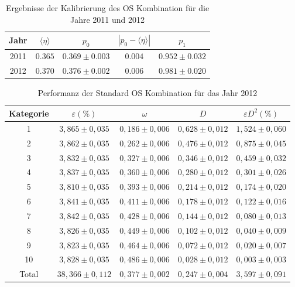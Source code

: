 \begin{table}[htbp]
	\centering
	\caption{Ergebnisse der Kalibrierung des OS Kombination für die Jahre \num{2011} und \num{2012}}
	\label{tab:result_OScomb}
	\begin{tabular}{ccccc}
	\toprule
       Jahr & $\langle\eta\rangle$ & $p_0$ & $\left|p_0-\langle\eta\rangle\right|$ & $p_1$ \\ 
       \midrule 
       2011 & $0{.}365$ & $0{.}369\pm0{.}003$ & $0{.}004$ & $0{.}952\pm0{.}032$ \\
      2012 & $0{.}370$ & $0{.}376\pm0{.}002$ & $0{.}006$ & $0{.}981\pm0{.}020$ \\ 
      \bottomrule
	\end{tabular}
\end{table} 
\begin{table}[htbp]
	\centering
	\caption{Performanz der Standard OS Kombination für das Jahr \num{2012}}
	\label{tab:2012_OScomb}
	\begin{tabular}{ccccc}
	\toprule
       Kategorie & $\varepsilon(\%)$ & $\omega$ & $D$ & $\varepsilon D^2(\%)$ \\ 
       \midrule
       1 & $3{,}865\pm0{,}035$ & $0{,}186\pm0{,}006$ & $0{,}628\pm0{,}012$ & $1{,}524\pm0{,}060$\\
       2 & $3{,}862\pm0{,}035$ & $0{,}262\pm0{,}006$ & $0{,}476\pm0{,}012$ & $0{,}875\pm0{,}045$\\ 
       3 & $3{,}832\pm0{,}035$ & $0{,}327\pm0{,}006$ & $0{,}346\pm0{,}012$ & $0{,}459\pm0{,}032$\\ 
       4 & $3{,}837\pm0{,}035$ & $0{,}360\pm0{,}006$ & $0{,}280\pm0{,}012$ & $0{,}301\pm0{,}026$\\ 
       5 & $3{,}810\pm0{,}035$ & $0{,}393\pm0{,}006$ & $0{,}214\pm0{,}012$ & $0{,}174\pm0{,}020$\\ 
       6 & $3{,}841\pm0{,}035$ & $0{,}411\pm0{,}006$ & $0{,}178\pm0{,}012$ & $0{,}122\pm0{,}016$\\ 
       7 & $3{,}842\pm0{,}035$ & $0{,}428\pm0{,}006$ & $0{,}144\pm0{,}012$ & $0{,}080\pm0{,}013$\\ 
       8 & $3{,}826\pm0{,}035$ & $0{,}449\pm0{,}006$ & $0{,}102\pm0{,}012$ & $0{,}040\pm0{,}009$\\ 
       9 & $3{,}823\pm0{,}035$ & $0{,}464\pm0{,}006$ & $0{,}072\pm0{,}012$ & $0{,}020\pm0{,}007$\\ 
      10 & $3{,}828\pm0{,}035$ & $0{,}486\pm0{,}006$ & $0{,}028\pm0{,}012$ & $0{,}003\pm0{,}003$\\ 
      \midrule
   Total & $38{,}366\pm0{,}112$& $0{,}377\pm0{,}002$ & $0{,}247\pm0{,}004$ & $3{,}597\pm0{,}091$\\ 
   \bottomrule
	\end{tabular}
\end{table}
